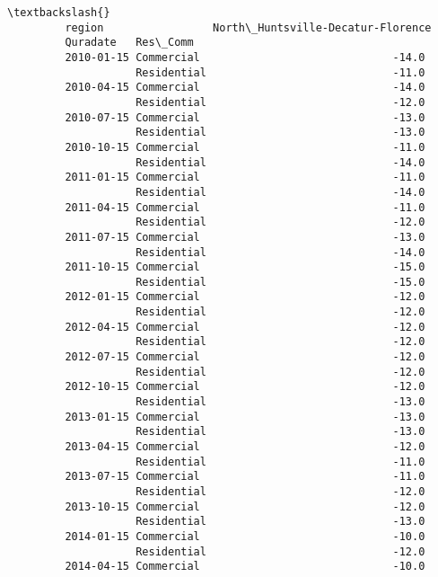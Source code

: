 \documentclass[11pt]{article}
\begin{document}
\begin{Verbatim}[commandchars=\\\{\}]
                                                                   \textbackslash{}
         region                 North\_Huntsville-Decatur-Florence   
         Quradate   Res\_Comm                                        
         2010-01-15 Commercial                              -14.0   
                    Residential                             -11.0   
         2010-04-15 Commercial                              -14.0   
                    Residential                             -12.0   
         2010-07-15 Commercial                              -13.0   
                    Residential                             -13.0   
         2010-10-15 Commercial                              -11.0   
                    Residential                             -14.0   
         2011-01-15 Commercial                              -11.0   
                    Residential                             -14.0   
         2011-04-15 Commercial                              -11.0   
                    Residential                             -12.0   
         2011-07-15 Commercial                              -13.0   
                    Residential                             -14.0   
         2011-10-15 Commercial                              -15.0   
                    Residential                             -15.0   
         2012-01-15 Commercial                              -12.0   
                    Residential                             -12.0   
         2012-04-15 Commercial                              -12.0   
                    Residential                             -12.0   
         2012-07-15 Commercial                              -12.0   
                    Residential                             -12.0   
         2012-10-15 Commercial                              -12.0   
                    Residential                             -13.0   
         2013-01-15 Commercial                              -13.0   
                    Residential                             -13.0   
         2013-04-15 Commercial                              -12.0   
                    Residential                             -11.0   
         2013-07-15 Commercial                              -11.0   
                    Residential                             -12.0   
         2013-10-15 Commercial                              -12.0   
                    Residential                             -13.0   
         2014-01-15 Commercial                              -10.0   
                    Residential                             -12.0   
         2014-04-15 Commercial                              -10.0   

\end{Verbatim}
\end{document}
